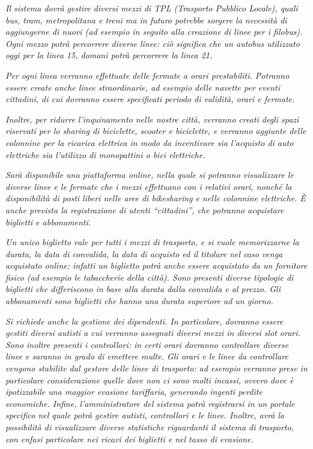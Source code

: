 \documentclass[12pt,a4paper]{report}
\begin{document}
\textit{Il sistema dovrà gestire diversi mezzi di TPL (Trasporto Pubblico Locale), quali bus, tram, metropolitana e treni ma in futuro potrebbe sorgere la necessità di aggiungerne di nuovi (ad esempio in seguito alla creazione di linee per i filobus). Ogni mezzo potrà percorrere diverse linee: ciò significa che un autobus utilizzato oggi per la linea 15, domani potrà percorrere la linea 21.}

\textit{Per ogni linea verranno effettuate delle fermate a orari prestabiliti. Potranno essere create anche linee straordinarie, ad esempio delle navette per eventi cittadini, di cui dovranno essere specificati periodo di validità, orari e fermate.}

\textit{Inoltre, per ridurre l’inquinamento nelle nostre città, verranno creati degli spazi riservati per lo sharing di biciclette, scooter e biciclette, e verranno aggiunte delle colonnine per la ricarica elettrica in modo da incentivare sia l’acquisto di auto elettriche sia l’utilizzo di monopattini o bici elettriche.}

\textit{Sarà disponibile una piattaforma online, nella quale si potranno visualizzare le diverse linee e le fermate che i mezzi effettuano con i relativi orari, nonché la disponibilità di posti liberi nelle aree di bikesharing e nelle colonnine elettriche. È anche prevista la registrazione di utenti “cittadini”, che potranno acquistare biglietti e abbonamenti. }

\textit{Un unico biglietto vale per tutti i mezzi di trasporto, e si vuole memorizzarne la durata, la data di convalida, la data di acquisto ed il titolare nel caso venga acquistato online: infatti un biglietto potrà anche essere acquistato da un fornitore fisico (ad esempio le tabaccherie della città). Sono presenti diverse tipologie di biglietti che differiscono in base alla durata dalla convalida e al prezzo. Gli abbonamenti sono biglietti che hanno una durata superiore ad un giorno.}

\textit{Si richiede anche la gestione dei dipendenti. In particolare, dovranno essere gestiti diversi autisti a cui verranno assegnati diversi mezzi in diversi slot orari. Sono inoltre presenti i controllori: in certi orari dovranno controllare diverse linee e saranno in grado di emettere multe. Gli orari e le linee da controllare vengono stabilite dal gestore delle linee di trasporto: ad esempio verranno prese in particolare considerazione quelle dove non ci sono molti incassi, ovvero dove è ipotizzabile una maggior evasione tariffaria, generando ingenti perdite economiche. Infine, l’amministratore del sistema potrà registrarsi in un portale specifico nel quale potrà gestire autisti, controllori e le linee. Inoltre, avrà la possibilità di visualizzare diverse statistiche riguardanti il sistema di trasporto, con enfasi particolare nei ricavi dei biglietti e nel tasso di evasione.}
\end{document}
